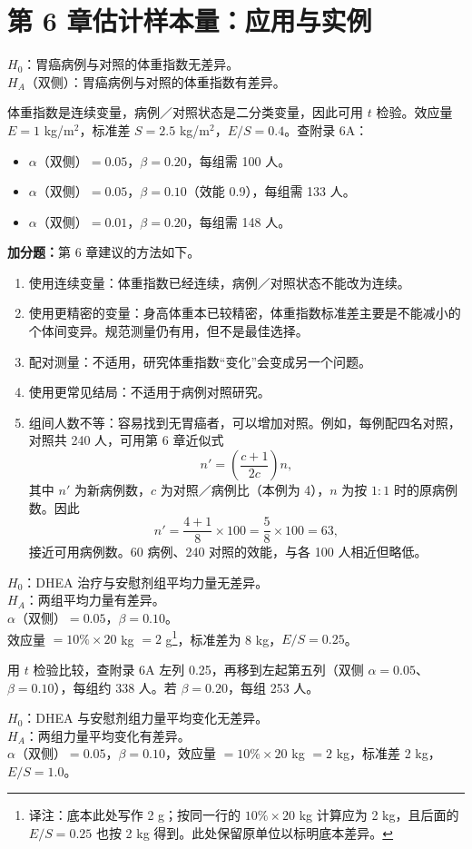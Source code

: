 \section{第 6 章\quad 估计样本量：应用与实例}
\begin{answerlist}
\item[1.] $H_0$：胃癌病例与对照的体重指数无差异。\\
$H_A$（双侧）：胃癌病例与对照的体重指数有差异。

体重指数是连续变量，病例／对照状态是二分类变量，因此可用 $t$ 检验。效应量 $E=1$ kg/m$^2$，标准差 $S=2.5$ kg/m$^2$，$E/S=0.4$。查附录 6A：
\begin{itemize}
\item $\alpha$（双侧）$=0.05$，$\beta=0.20$，每组需 100 人。
\item $\alpha$（双侧）$=0.05$，$\beta=0.10$（效能 0.9），每组需 133 人。
\item $\alpha$（双侧）$=0.01$，$\beta=0.20$，每组需 148 人。
\end{itemize}
\textbf{加分题：}第 6 章建议的方法如下。
\begin{enumerate}
\item 使用连续变量：体重指数已经连续，病例／对照状态不能改为连续。
\item 使用更精密的变量：身高体重本已较精密，体重指数标准差主要是不能减小的个体间变异。规范测量仍有用，但不是最佳选择。
\item 配对测量：不适用，研究体重指数“变化”会变成另一个问题。
\item 使用更常见结局：不适用于病例对照研究。
\item 组间人数不等：容易找到无胃癌者，可以增加对照。例如，每例配四名对照，对照共 240 人，可用第 6 章近似式
\[
n'=\left(\frac{c+1}{2c}\right)n,
\]
其中 $n'$ 为新病例数，$c$ 为对照／病例比（本例为 4），$n$ 为按 $1:1$ 时的原病例数。因此
\[
n'=\frac{4+1}{8}\times100=\frac58\times100=63,
\]
接近可用病例数。60 病例、240 对照的效能，与各 100 人相近但略低。
\end{enumerate}
\item[2.] $H_0$：DHEA 治疗与安慰剂组平均力量无差异。\\
$H_A$：两组平均力量有差异。\\
$\alpha$（双侧）$=0.05$，$\beta=0.10$。\\
效应量 $=10\%\times20$ kg $=2$ g\footnote{译注：底本此处写作 2 g；按同一行的 $10\%\times20$ kg 计算应为 2 kg，且后面的 $E/S=0.25$ 也按 2 kg 得到。此处保留原单位以标明底本差异。}，标准差为 8 kg，$E/S=0.25$。

用 $t$ 检验比较，查附录 6A 左列 0.25，再移到左起第五列（双侧 $\alpha=0.05$、$\beta=0.10$），每组约 338 人。若 $\beta=0.20$，每组 253 人。
\item[3.] $H_0$：DHEA 与安慰剂组力量平均变化无差异。\\
$H_A$：两组力量平均变化有差异。\\
$\alpha$（双侧）$=0.05$，$\beta=0.10$，效应量 $=10\%\times20$ kg $=2$ kg，标准差 2 kg，$E/S=1.0$。


\end{answerlist}
